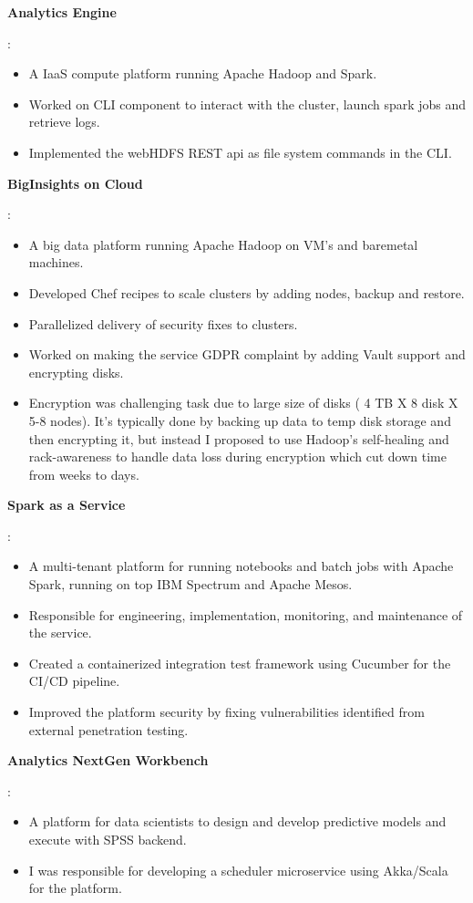 \documentclass[a4paper,11pt]{article}
\newcommand{\resumeItem}[2]{
  \item[]\small{
    \textbf{#1}{: #2 \vspace{-2pt}}
  }
}
\begin{document}
\resumeItem{Analytics Engine}
{
    \begin{itemize}[leftmargin=*]
        \item A IaaS compute platform running Apache Hadoop and Spark.
        \item Worked on CLI component to interact with the cluster, launch spark jobs and retrieve logs.
        \item Implemented the webHDFS REST api as file system commands in the CLI.
    \end{itemize}
}

\resumeItem{BigInsights on Cloud}
{
    \begin{itemize}[leftmargin=*]
        \item A big data platform running Apache Hadoop on VM's and baremetal machines.
        \item Developed Chef recipes to scale clusters by adding nodes, backup and restore.
        \item Parallelized delivery of security fixes to clusters.
        \item Worked on making the service GDPR complaint by adding Vault support and encrypting disks.
        \item Encryption was challenging task due to large size of disks ( 4 TB X 8 disk X 5-8 nodes). It's typically done by backing up data to temp disk storage and then encrypting it, but instead I proposed to use Hadoop’s self-healing and rack-awareness to handle data loss during encryption which cut down time from weeks to days.
    \end{itemize}
}

\resumeItem{Spark as a Service}
{
    \begin{itemize}[leftmargin=*]
        \item A multi-tenant platform for running notebooks and batch jobs with Apache Spark, running on top IBM Spectrum and Apache Mesos.
        \item Responsible for engineering, implementation, monitoring, and maintenance of the service.
        \item Created a containerized integration test framework using Cucumber for the CI/CD pipeline.
        \item Improved the platform security by fixing vulnerabilities identified from external penetration testing.
    \end{itemize}
}

\resumeItem{Analytics NextGen Workbench}
{
    \begin{itemize}[leftmargin=*]
        \item A platform for data scientists to design and develop predictive models and execute with SPSS backend.
        \item I was responsible for developing a scheduler microservice using Akka/Scala for the platform.
    \end{itemize}
}
\end{document}
